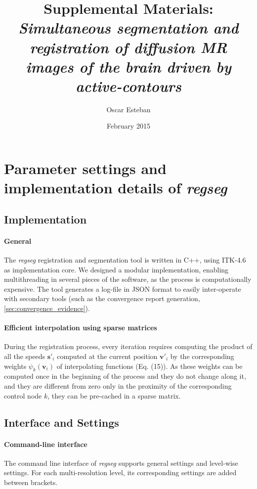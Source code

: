 \documentclass[a4paper]{report}
\begin{document}
\title{Supplemental Materials: \emph{Simultaneous segmentation and registration of
diffusion MR images of the brain driven by active-contours}}
\author{Oscar Esteban}
\date{February 2015}

\maketitle

\section{Parameter settings and implementation details of \emph{regseg}}

\subsection{Implementation}
\paragraph{General} The \emph{regseg} registration and segmentation tool is written in C++, using ITK-4.6 as
  implementation core.
We designed a modular implementation, enabling multithreading in several pieces of the software,
  as the process is computationally expensive.
The tool generates a log-file in JSON format to easily inter-operate with secondary tools (such
  as the convergence report generation, \autoref{sec:convergence_evidence}).

\paragraph{Efficient interpolation using sparse matrices}
During the registration process, every iteration requires computing the product of all the speeds
  $\mathbf{s}'_i$ computed at the current position $\mathbf{v}'_i$ by the corresponding weights
  $\psi_k(\mathbf{v}_i)$ of interpolating functions (Eq. (15)).
As these weights can be computed once in the beginning of the process and they do not change along
  it, and they are different from zero only in the proximity of the corresponding control node $k$,
  they can be pre-cached in a sparse matrix.

\subsection{Interface and Settings}\label{sec:interface_settings}

\paragraph{Command-line interface}
The command line interface of \emph{regseg} supports general settings and level-wise settings.
For each multi-resolution level, its corresponding settings are added between brackets.
\end{document}
